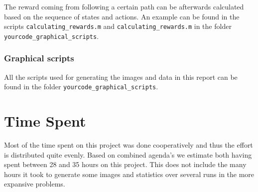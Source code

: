 \documentclass[10pt,a4paper]{article}
\begin{document}
The reward coming from following a certain path can be afterwards calculated based on the sequence of states and actions. An example can be found in the scripts \texttt{calculating\_rewards.m} and \texttt{calculating\_rewards.m} in the folder \texttt{yourcode\_graphical\_scripts}.

\subsubsection*{Graphical scripts}
All the scripts used for generating the images and data in this report can be found in the folder \texttt{yourcode\_graphical\_scripts}.


\section{Time Spent}
Most of the time spent on this project was done cooperatively and thus the effort is distributed quite evenly.
Based on combined agenda's we estimate both having spent between 28 and 35 hours on this project. 
This does not include the many hours it took to generate some images and statistics over several runs in the more expansive problems.
\end{document}
